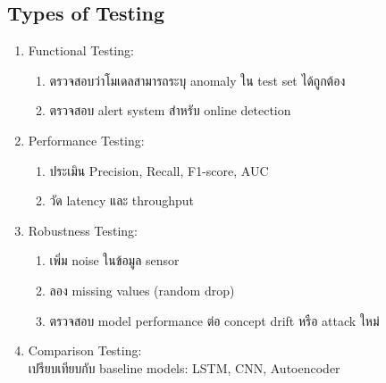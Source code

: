 \subsection{Types of Testing}
\begin{enumerate}
    \item Functional Testing:
    \begin{enumerate}
        \item ตรวจสอบว่าโมเดลสามารถระบุ anomaly ใน test set ได้ถูกต้อง
        \item ตรวจสอบ alert system สำหรับ online detection
    \end{enumerate}
    \item Performance Testing:
    \begin{enumerate}
        \item ประเมิน Precision, Recall, F1-score, AUC
        \item วัด latency และ throughput
    \end{enumerate}
    \item Robustness Testing:
    \begin{enumerate}
        \item เพิ่ม noise ในข้อมูล sensor
        \item ลอง missing values (random drop)
        \item ตรวจสอบ model performance ต่อ concept drift หรือ attack ใหม่
    \end{enumerate}\item Comparison Testing: \\ เปรียบเทียบกับ baseline models: LSTM, CNN, Autoencoder
\end{enumerate}
